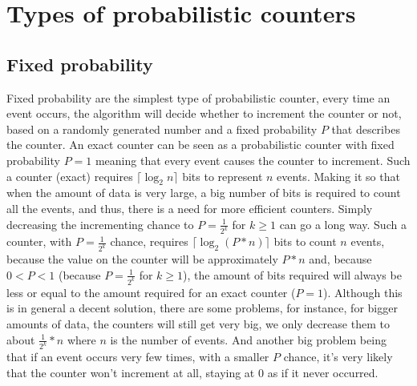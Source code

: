 \documentclass[...]{revdetua}
\begin{document}
\section{Types of probabilistic counters}
\subsection{Fixed probability}
Fixed probability are the simplest type of probabilistic counter, every time an event occurs, the algorithm will decide whether to increment the counter or not, based on a randomly generated number and a fixed probability $P$ that describes the counter.
An exact counter can be seen as a probabilistic counter with fixed probability $P=1$ meaning that every event causes the counter to increment. Such a counter (exact) requires $\lceil \log_2 n \rceil$ bits to represent $n$ events. Making it so that when the amount of data is very large, a big number of bits is required to count all the events, and thus, there is a need for more efficient counters.
Simply decreasing the incrementing chance to  $P=\frac{1}{2^k}$ for $k \geq 1$ can go a long way.
Such a counter, with $P=\frac{1}{2^k}$ chance, requires $\lceil \log_2 (P*n) \rceil$ bits to count $n$ events, because the value on the counter will be approximately $P*n$ and, because $0<P<1$ (because $P=\frac{1}{2^k}$ for $k \geq 1$), the amount of bits required will always be less or equal to the amount required for an exact counter ($P=1$). 
Although this is in general a decent solution, there are some problems, for instance, for bigger amounts of data, the counters will still get very big, we only decrease them to about $\frac{1}{2^k}*n$ where $n$ is the number of events. And another big problem being that if an event occurs very few times, with a smaller $P$ chance, it's very likely that the counter won't increment at all, staying at $0$ as if it never occurred.
\end{document}
